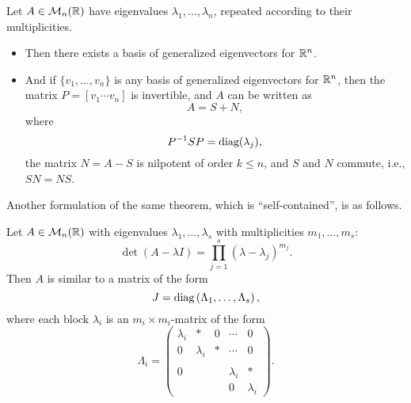 \begin{theorem}
\label{th:Jordan_form}
Let $A\in\mathcal{M}_n(\mathbb{R})$ have eigenvalues $\lambda_1,\ldots,\lambda_n$, repeated according to their multiplicities. 
\begin{itemize}
\item 
Then there exists a basis of generalized eigenvectors for $\mathbb{R}^n$. 
\item 
And if $\{v_1,\ldots,v_n\}$ is any basis of generalized eigenvectors for $\mathbb{R}^n$, then the matrix $P=[v_1\cdots v_n]$ is invertible, and $A$ can be written as
\[
A=S+N,
\]
where
\[
P^{-1}SP=\textrm{diag}(\lambda_j),
\]
the matrix $N=A-S$ is nilpotent of order $k\leq n$, and $S$ and $N$ commute, i.e., $SN=NS$.
\end{itemize}
\end{theorem}
Another formulation of the same theorem, which is ``self-contained'', is as follows.
\begin{theorem}
Let $A\in\mathcal{M}_n(\mathbb{R})$ with eigenvalues $\lambda_1,\ldots,\lambda_s$ with multiplicities $m_1,\ldots,m_s$:
\[
\det\left(A-\lambda I\right)=\prod_{j=1}^s(\lambda-\lambda_j)^{m_j}.
\]
Then $A$ is similar to a matrix of the form
\[
J=\textrm{diag}\left(\Lambda_1,\ldots,\Lambda_s\right),
\]
where each block $\lambda_i$ is an $m_i\times m_i$-matrix of the form
\[
\Lambda_i=
\begin{pmatrix}
\lambda_i & \ast & 0 &\cdots & 0 \\
0 & \lambda_i & \ast & \cdots & 0 \\
 & & & &  \\
0 & & & \lambda_i & \ast \\
& & & 0 & \lambda_i
\end{pmatrix}.
\]

\end{theorem}


